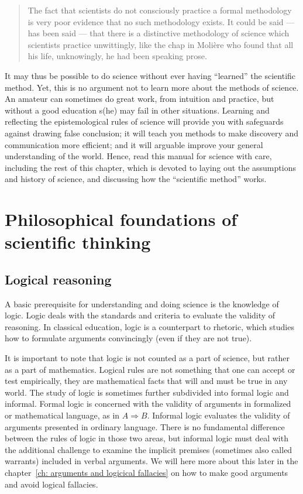 \documentclass{tufte-book}
\begin{document}
\begin{quote}
The fact that scientists do not consciously practice a formal methodology is very poor evidence that no such methodology exists. It could be said — has been said — that there is a distinctive methodology of science which scientists practice unwittingly, like the chap in Molière who found that all his life, unknowingly, he had been speaking prose.
\end{quote}

It may thus be possible to do science without ever having ``learned'' the scientific method. Yet, this is no argument not to learn more about the methods of science. An amateur can sometimes do great work, from intuition and practice, but without a good education s(he) may fail in other situations. Learning and reflecting the epistemological rules of science will provide you with safeguards against drawing false conclusion; it will teach you methods to make discovery and communication more efficient; and it will arguable improve your general understanding of the world. Hence, read this manual for science with care, including the  rest of this chapter, which is devoted to laying out the assumptions and history of science, and discussing how the ``scientific method'' works. 


\section{Philosophical foundations of scientific thinking}


\subsection{Logical reasoning}

A basic prerequisite for understanding and doing science is the knowledge of logic. Logic deals with the standards and criteria to evaluate the validity of reasoning. In classical education, logic is a counterpart to rhetoric, which studies how to formulate arguments convincingly (even if they are not true).

It is important to note that logic is not counted as a part of science, but rather as a part of mathematics. Logical rules are not something that one can accept or test empirically, they are mathematical facts that will and must be true in any world. The study of logic is sometimes further subdivided into formal logic and informal. Formal logic is concerned with the validity of arguments in formalized or mathematical language, as in $A\Rightarrow B$. Informal logic evaluates the validity of arguments presented in ordinary language. There is no fundamental difference between the rules of logic in those two areas, but informal logic must deal with the additional challenge to examine the implicit premises (sometimes also called warrants) included in verbal arguments. We will here more about this later in the chapter~\ref{ch: arguments and logicical fallacies} on how to make good arguments and avoid logical fallacies.  
\end{document}
